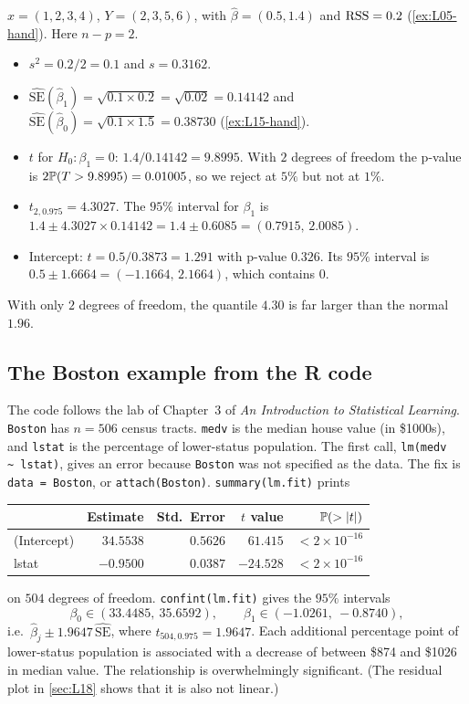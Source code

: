 \begin{example}\label{ex:L16-hand}
$x=(1,2,3,4)$, $Y=(2,3,5,6)$, with $\hat\beta=(0.5,1.4)$ and $\mathrm{RSS}=0.2$ (\cref{ex:L05-hand}). Here $n-p=2$.
\begin{itemize}
  \item $s^2=0.2/2=0.1$ and $s=0.3162$.
  \item $\widehat{\mathrm{SE}}(\hat\beta_1)=\sqrt{0.1\times 0.2}=\sqrt{0.02}=0.14142$ and $\widehat{\mathrm{SE}}(\hat\beta_0)=\sqrt{0.1\times1.5}=0.38730$ (\cref{ex:L15-hand}).
  \item $t$ for $H_0:\beta_1=0$: $1.4/0.14142=9.8995$. With $2$ degrees of freedom the p-value is $2\mathbb P(T>9.8995)=0.01005$, so we reject at $5\%$ but not at $1\%$.
  \item $t_{2,0.975}=4.3027$. The $95\%$ interval for $\beta_1$ is $1.4\pm4.3027\times0.14142=1.4\pm0.6085=(0.7915,\,2.0085)$.
  \item Intercept: $t=0.5/0.3873=1.291$ with p-value $0.326$. Its $95\%$ interval is $0.5\pm1.6664=(-1.1664,\,2.1664)$, which contains $0$.
\end{itemize}
With only $2$ degrees of freedom, the quantile $4.30$ is far larger than the normal $1.96$.
\end{example}

\subsection{The Boston example from the R code}
\begin{example}\label{ex:L16-boston}
The code follows the lab of Chapter~3 of \emph{An Introduction to Statistical Learning}. \texttt{Boston} has
$n=506$ census tracts. \texttt{medv} is the median house value (in \$1000s), and \texttt{lstat} is the
percentage of lower-status population. The first call, \texttt{lm(medv \textasciitilde\ lstat)}, gives an error
because \texttt{Boston} was not specified as the data. The fix is \texttt{data = Boston}, or \texttt{attach(Boston)}.
\texttt{summary(lm.fit)} prints
\begin{center}
\begin{tabular}{lrrrr}\hline
 & Estimate & Std.\ Error & $t$ value & $\mathbb P(>\left|t\right|)$\\\hline
(Intercept) & $34.5538$ & $0.5626$ & $61.415$ & $<2\times10^{-16}$\\
lstat & $-0.9500$ & $0.0387$ & $-24.528$ & $<2\times10^{-16}$\\\hline
\end{tabular}
\end{center}
on $504$ degrees of freedom. \texttt{confint(lm.fit)} gives the $95\%$ intervals
\[
\beta_0\in(33.4485,\ 35.6592),\qquad \beta_1\in(-1.0261,\ -0.8740),
\]
i.e.\ $\hat\beta_j\pm1.9647\,\widehat{\mathrm{SE}}$, where $t_{504,0.975}=1.9647$. Each additional percentage point of
lower-status population is associated with a decrease of between \$874 and \$1026 in median value. The
relationship is overwhelmingly significant. (The residual plot in \cref{sec:L18} shows that it is also
not linear.)
\end{example}

